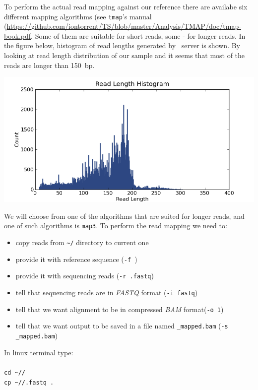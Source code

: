 To perform the actual read mapping against our reference there are availabe six different
mapping algorithms (see \texttt{tmap}'s manual (\url{https://github.com/iontorrent/TS/blob/master/Analysis/TMAP/doc/tmap-book.pdf}.
Some of them are suitable for short reads, some - for longer reads.
In the figure below, histogram of read lengths generated by \IonTorrent~server is shown.
By looking at read length distribution of our sample and it seems that most of
the reads are longer than 150~bp.
\begin{center}
  \includegraphics[width=\linewidth, keepaspectratio]{snp_calling/IonXpress_001_rawlib.read_len_histogram.png}
\end{center}
We will choose from one of the algorithms that are suited for longer reads, and
one of such algorithms is \texttt{map3}. To perform the read mapping we need to:
\begin{itemize}
  \item copy reads from \texttt{\textasciitilde/\dataDir} directory to current one
  \item provide it with reference sequence (\texttt{-f })
  \item provide it with sequencing reads (\texttt{-r \mapReads.fastq})
  \item tell that sequencing reads are in \textit{FASTQ} format (\texttt{-i fastq})
  \item tell that we want alignment to be in compressed \textit{BAM} format(\texttt{-o 1})
  \item tell that we want output to be saved in a file named \texttt{\mapReads\_mapped.bam} (\texttt{-s \mapReads\_mapped.bam})
\end{itemize}
In linux terminal type:\\~\\
\texttt{cd \textasciitilde/\workDir/\reseqDir}\\
\texttt{cp \textasciitilde/\dataDir/\mapReads.fastq .}\\
\\

